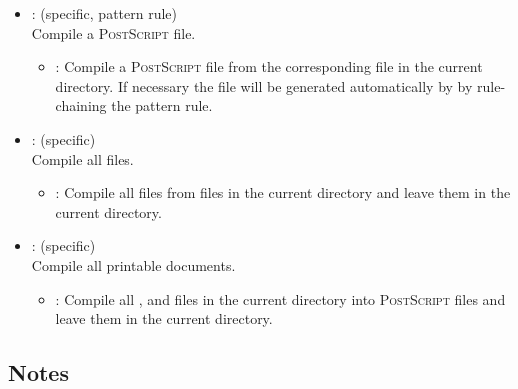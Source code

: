 \begin{itemize}
\item
    : (specific, pattern rule)
   \\ Compile a  \textsc{PostScript} file.
   \begin{itemize}
   \item
      : Compile a  \textsc{PostScript} file from the
      corresponding  file in the current directory.  If necessary
      the  file will be generated automatically by 
      by rule-chaining the  pattern rule.
   \end{itemize}

\item
    : (specific)
   \\ Compile all  files.
   \begin{itemize}
   \item
      : Compile all  files from  files in
      the current directory and leave them in the current directory.
   \end{itemize}

\item
    : (specific)
   \\ Compile all printable documents.
   \begin{itemize}
   \item
      : Compile all ,  and 
      files in the current directory into  \textsc{PostScript} files
      and leave them in the current directory.
   \end{itemize}
\end{itemize}

\subsection*{Notes}

